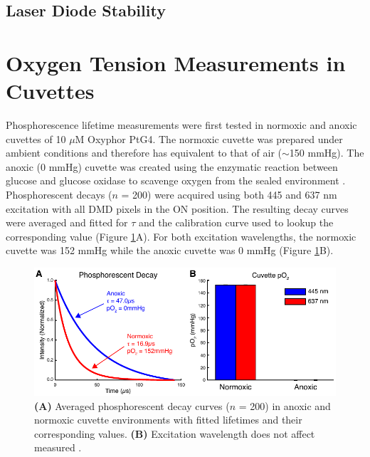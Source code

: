\subsection{Laser Diode Stability}

\blindtext



\section{Oxygen Tension Measurements in Cuvettes}

Phosphorescence lifetime measurements were first tested in normoxic and anoxic cuvettes of 10 $\mu$M Oxyphor PtG4. The normoxic cuvette was prepared under ambient conditions and therefore has  equivalent to that of air ($\sim$150 mmHg). The anoxic (0 mmHg) cuvette was created using the enzymatic reaction between glucose and glucose oxidase to scavenge oxygen from the sealed environment \cite{Lo:1997he}. Phosphorescent decays ($n$ = 200) were acquired using both 445 and 637 nm excitation with all DMD pixels in the ON position. The resulting decay curves were averaged and fitted for $\tau$ and the calibration curve used to lookup the corresponding  value (Figure \ref{fig:cuvette}A). For both excitation wavelengths, the normoxic cuvette  was 152 mmHg while the anoxic cuvette  was 0 mmHg (Figure \ref{fig:cuvette}B).

\begin{figure}
    \includegraphics{figures/chapter_2/cuvette.pdf}
    \caption {
        \label{fig:cuvette}
        \textbf{(A)} Averaged phosphorescent decay curves ($n$ = 200) in anoxic and normoxic cuvette environments with fitted lifetimes and their corresponding  values. \textbf{(B)} Excitation wavelength does not affect measured .
    }
\end{figure}

